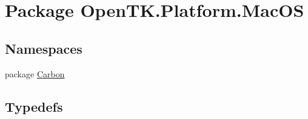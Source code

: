 \hypertarget{namespace_open_t_k_1_1_platform_1_1_mac_o_s}{\section{Package Open\-T\-K.\-Platform.\-Mac\-O\-S}
\label{namespace_open_t_k_1_1_platform_1_1_mac_o_s}
}
\subsection*{Namespaces}
\begin{DoxyCompactItemize}
\item 
package \hyperlink{namespace_open_t_k_1_1_platform_1_1_mac_o_s_1_1_carbon}{Carbon}
\end{DoxyCompactItemize}
\subsection*{Typedefs}
